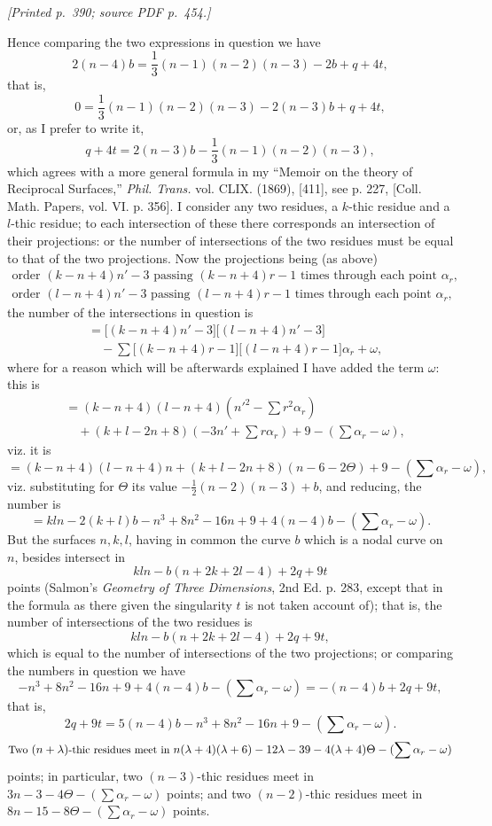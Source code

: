 \documentclass[11pt,a4paper]{article}
\newcommand{\sourcepage}[2]{\par\smallskip\noindent\textit{[Printed p.~#1; source PDF p.~#2.]}\par\smallskip}
\begin{document}
\sourcepage{390}{454}
Hence comparing the two expressions in question we have
\[
2(n-4)b=\frac13(n-1)(n-2)(n-3)-2b+q+4t,
\]
that is,
\[
0=\frac13(n-1)(n-2)(n-3)-2(n-3)b+q+4t,
\]
or, as I prefer to write it,
\[
q+4t=2(n-3)b-\frac13(n-1)(n-2)(n-3),
\]
which agrees with a more general formula in my ``Memoir on the theory of Reciprocal
Surfaces,'' \textit{Phil. Trans.} vol. CLIX. (1869), [411], see p. 227,
[Coll. Math. Papers, vol. VI. p. 356]. I consider any two residues, a $k$-thic residue
and a $l$-thic residue; to each intersection of these there corresponds an intersection
of their projections: or the number of intersections of the two residues must be equal
to that of the two projections. Now the projections being (as above)
\[
\begin{array}{l}
\text{order }(k-n+4)n'-3\text{ passing }(k-n+4)r-1\text{ times through each point }\alpha_r,\\
\text{order }(l-n+4)n'-3\text{ passing }(l-n+4)r-1\text{ times through each point }\alpha_r,
\end{array}
\]
the number of the intersections in question is
\[
\begin{aligned}
&=\bigl[(k-n+4)n'-3\bigr]\bigl[(l-n+4)n'-3\bigr]\\
&\quad-\sum\bigl[(k-n+4)r-1\bigr]\bigl[(l-n+4)r-1\bigr]\alpha_r+\omega,
\end{aligned}
\]
where for a reason which will be afterwards explained I have added the term $\omega$:
this is
\[
\begin{aligned}
&=(k-n+4)(l-n+4)\left(n'^2-\sum r^2\alpha_r\right)\\
&\quad+(k+l-2n+8)\left(-3n'+\sum r\alpha_r\right)+9-\left(\sum\alpha_r-\omega\right),
\end{aligned}
\]
viz. it is
\[
=(k-n+4)(l-n+4)n+(k+l-2n+8)(n-6-2\Theta)
+9-(\sum\alpha_r-\omega),
\]
viz. substituting for $\Theta$ its value $-\frac12(n-2)(n-3)+b$, and reducing, the
number is
\[
=kln-2(k+l)b-n^3+8n^2-16n+9+4(n-4)b-(\sum\alpha_r-\omega).
\]
But the surfaces $n,k,l$, having in common the curve $b$ which is a nodal curve on
$n$, besides intersect in
\[
kln-b(n+2k+2l-4)+2q+9t
\]
points (Salmon's \textit{Geometry of Three Dimensions}, 2nd Ed. p. 283, except that in the
formula as there given the singularity $t$ is not taken account of); that is, the number
of intersections of the two residues is
\[
kln-b(n+2k+2l-4)+2q+9t,
\]
which is equal to the number of intersections of the two projections; or comparing the
numbers in question we have
\[
-n^3+8n^2-16n+9+4(n-4)b-(\sum\alpha_r-\omega)
=-(n-4)b+2q+9t,
\]
that is,
\[
2q+9t=5(n-4)b-n^3+8n^2-16n+9-(\sum\alpha_r-\omega).
\]
\[
\text{\small Two }(n+\lambda)\text{\small -thic residues meet in }
n(\lambda+4)(\lambda+6)-12\lambda-39-4(\lambda+4)\Theta-(\sum\alpha_r-\omega)
\]
points; in particular, two $(n-3)$-thic residues meet in
$3n-3-4\Theta-(\sum\alpha_r-\omega)$ points; and two $(n-2)$-thic residues meet in
$8n-15-8\Theta-(\sum\alpha_r-\omega)$ points.
\end{document}
